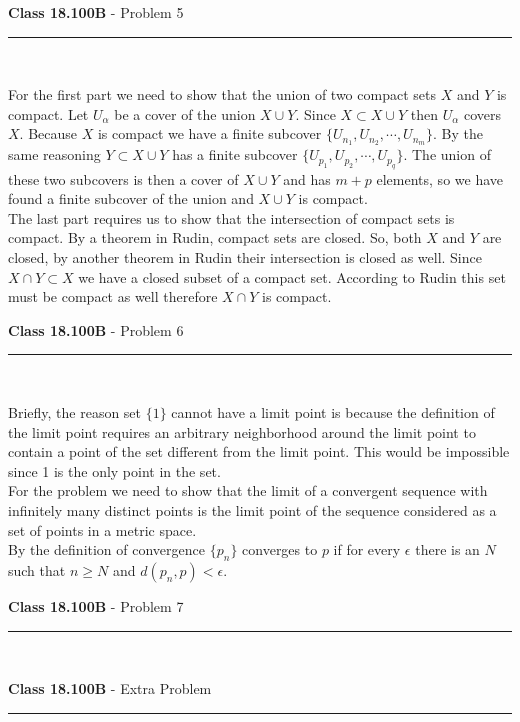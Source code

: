 \documentclass[11pt,reqno]{article}
\begin{document}
\vspace{15pt}
\begin{flushleft} 
\textbf{Class 18.100B} - Problem 5\\
\rule{500pt}{1pt}\\
\end{flushleft} 

For the first part we need to show that the union of two compact sets $X$ and $Y$ is compact. Let $U_{\alpha}$ be a cover of the union $X \cup Y$. Since $X \subset X \cup Y$ then $U_{\alpha}$ covers $X$. Because $X$ is compact we have a finite subcover $\{ U_{n_1}, U_{n_2}, \cdots, U_{n_m} \}$. By the same reasoning $Y \subset X \cup Y$ has a finite subcover $\{ U_{p_1}, U_{p_2}, \cdots, U_{p_q} \}$. The union of these two subcovers is then a cover of $X \cup Y$ and has $m + p$ elements, so we have found a finite subcover of the union and $X \cup Y$ is compact.\\
\indent The last part requires us to show that the intersection of compact sets is compact. By a theorem in Rudin, compact sets are closed. So, both $X$ and $Y$ are closed, by another theorem in Rudin their intersection is closed as well. Since $X \cap Y \subset X$ we have a closed subset of a compact set. According to Rudin this set must be compact as well therefore $X \cap Y$ is compact.

\vspace{15pt}
\begin{flushleft} 
\textbf{Class 18.100B} - Problem 6\\
\rule{500pt}{1pt}\\
\end{flushleft} 

Briefly, the reason set $\{ 1 \}$ cannot have a limit point is because the definition of the limit point requires an arbitrary neighborhood around the limit point to contain a point of the set different from the limit point. This would be impossible since 1 is the only point in the set.\\
\indent For the problem we need to show that the limit of a convergent sequence with infinitely many distinct points is the limit point of the sequence considered as a set of points in a metric space. \\
\indent By the definition of convergence $ \{ p_n \}$ converges to $p$ if for every $\epsilon$ there is an $N$ such that $n \ge N$ and $d(p_n,p) < \epsilon$.

\vspace{15pt}
\begin{flushleft} 
\textbf{Class 18.100B} - Problem 7\\
\rule{500pt}{1pt}\\
\end{flushleft} 

\vspace{15pt}
\begin{flushleft} 
\textbf{Class 18.100B} - Extra Problem \\
\rule{500pt}{1pt}\\
\end{flushleft} 
\end{document}
